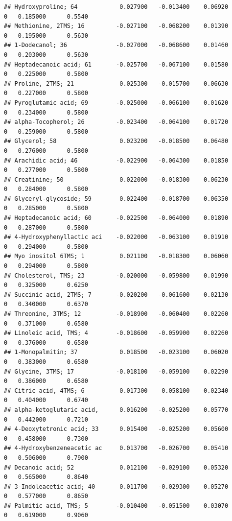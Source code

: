 \documentclass[]{article}
\begin{document}
\begin{verbatim}
## Hydroxyproline; 64            0.027900   -0.013400    0.06920         0   0.185000      0.5540
## Methionine, 2TMS; 16         -0.027100   -0.068200    0.01390         0   0.195000      0.5630
## 1-Dodecanol; 36              -0.027000   -0.068600    0.01460         0   0.203000      0.5630
## Heptadecanoic acid; 61       -0.025700   -0.067100    0.01580         0   0.225000      0.5800
## Proline, 2TMS; 21             0.025300   -0.015700    0.06630         0   0.227000      0.5800
## Pyroglutamic acid; 69        -0.025000   -0.066100    0.01620         0   0.234000      0.5800
## alpha-Tocopherol; 26         -0.023400   -0.064100    0.01720         0   0.259000      0.5800
## Glycerol; 58                  0.023200   -0.018500    0.06480         0   0.276000      0.5800
## Arachidic acid; 46           -0.022900   -0.064300    0.01850         0   0.277000      0.5800
## Creatinine; 50                0.022000   -0.018300    0.06230         0   0.284000      0.5800
## Glyceryl-glycoside; 59        0.022400   -0.018700    0.06350         0   0.285000      0.5800
## Heptadecanoic acid; 60       -0.022500   -0.064000    0.01890         0   0.287000      0.5800
## 4-Hydroxyphenyllactic aci    -0.022000   -0.063100    0.01910         0   0.294000      0.5800
## Myo inositol 6TMS; 1          0.021100   -0.018300    0.06060         0   0.294000      0.5800
## Cholesterol, TMS; 23         -0.020000   -0.059800    0.01990         0   0.325000      0.6250
## Succinic acid, 2TMS; 7       -0.020200   -0.061600    0.02130         0   0.340000      0.6370
## Threonine, 3TMS; 12          -0.018900   -0.060400    0.02260         0   0.371000      0.6580
## Linoleic acid, TMS; 4        -0.018600   -0.059900    0.02260         0   0.376000      0.6580
## 1-Monopalmitin; 37            0.018500   -0.023100    0.06020         0   0.383000      0.6580
## Glycine, 3TMS; 17            -0.018100   -0.059100    0.02290         0   0.386000      0.6580
## Citric acid, 4TMS; 6         -0.017300   -0.058100    0.02340         0   0.404000      0.6740
## alpha-ketoglutaric acid,      0.016200   -0.025200    0.05770         0   0.442000      0.7210
## 4-Deoxytetronic acid; 33      0.015400   -0.025200    0.05600         0   0.458000      0.7300
## 4-Hydroxybenzeneacetic ac     0.013700   -0.026700    0.05410         0   0.506000      0.7900
## Decanoic acid; 52             0.012100   -0.029100    0.05320         0   0.565000      0.8640
## 3-Indoleacetic acid; 40       0.011700   -0.029300    0.05270         0   0.577000      0.8650
## Palmitic acid, TMS; 5        -0.010400   -0.051500    0.03070         0   0.619000      0.9060

\end{verbatim}
\end{document}
